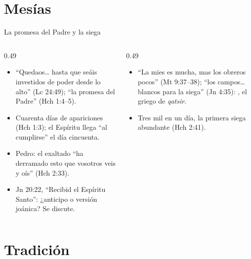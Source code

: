 \section{Mesías}

\begin{frame}{La promesa del Padre y la siega}
\begin{columns}[t,onlytextwidth]
\begin{column}{0.49\textwidth}\small\RaggedRight
\begin{itemize}
\item ``Quedaos\ldots{} hasta que seáis investidos de poder desde lo alto'' (Lc 24:49); ``la promesa del Padre'' (Hch 1:4--5).
\item Cuarenta días de apariciones (Hch 1:3); el Espíritu llega ``al cumplirse'' el día cincuenta.
\item Pedro: el exaltado ``ha derramado esto que vosotros veis y oís'' (Hch 2:33).
\item Jn 20:22, ``Recibid el Espíritu Santo'': ¿anticipo o versión joánica? Se discute.
\end{itemize}
\end{column}
\begin{column}{0.49\textwidth}\small\RaggedRight
\begin{itemize}
\item ``La mies es mucha, mas los obreros pocos'' (Mt 9:37--38); ``los campos\ldots{} blancos para la siega'' (Jn 4:35): , el griego de \emph{qatsir}.
\item Tres mil en un día, la primera siega abundante (Hch 2:41).
\end{itemize}
\end{column}
\end{columns}
\end{frame}

\section{Tradición}

